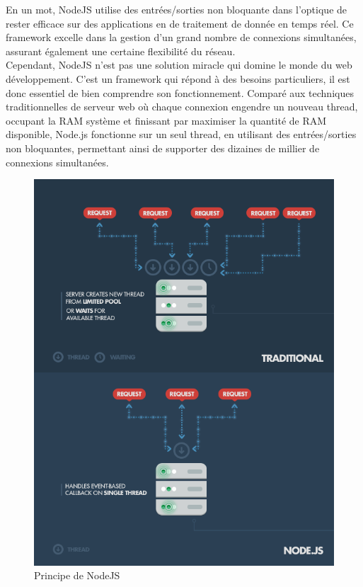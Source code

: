 \documentclass[oneside,a4paper,13pt]{article}
\begin{document}
En un mot, NodeJS utilise des entrées/sorties non bloquante dans l'optique de rester efficace sur des applications en de traitement de donnée en temps réel. Ce framework excelle dans la gestion d'un grand nombre de connexions simultanées, assurant également une certaine flexibilité du réseau. \\
Cependant, NodeJS n'est pas une solution miracle qui domine le monde du web développement. C'est un framework qui répond à des besoins particuliers, il est donc essentiel de bien comprendre son fonctionnement. Comparé aux techniques traditionnelles de serveur web où chaque connexion engendre un nouveau thread, occupant la RAM système et finissant par maximiser la quantité de RAM disponible, Node.js fonctionne sur un seul thread, en utilisant des entrées/sorties non bloquantes, permettant ainsi de supporter des dizaines de millier de connexions simultanées. 

\begin{figure}[H]
    \centering
        \includegraphics[scale=0.4]{Backend/Lang/NodeJS.png}
        \caption{Principe de NodeJS}
        \label{fig:my_label}
\end{figure}
\end{document}
